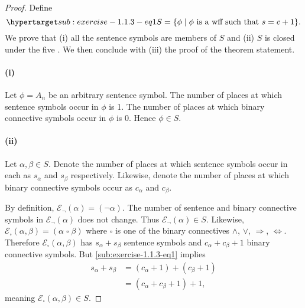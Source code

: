 \documentclass{report}
\begin{document}
  \begin{proof}

    Define
      \begin{equation}
        \hyperlabel{sub:exercise-1.1.3-eq1}
        S = \{\phi \mid \phi \text{ is a wff such that } s = c + 1\}.
      \end{equation}
    We prove that (i) all the sentence symbols are members of $S$ and (ii)
      $S$ is closed under the five .
    We then conclude with (iii) the proof of the theorem statement.

    \paragraph{(i)}%

      Let $\phi = A_n$ be an arbitrary sentence symbol.
      The number of places at which sentence symbols occur in $\phi$ is 1.
      The number of places at which binary connective symbols occur in $\phi$ is
        0.
      Hence $\phi \in S$.

    \paragraph{(ii)}%

      Let $\alpha, \beta \in S$.
      Denote the number of places at which sentence symbols occur in each as
        $s_\alpha$ and $s_\beta$ respectively.
      Likewise, denote the number of places at which binary connective symbols
        occur as $c_\alpha$ and $c_\beta$.

      By definition, $\mathcal{E}_{\neg}(\alpha) = (\neg\alpha)$.
      The number of sentence and binary connective symbols in
        $\mathcal{E}_{\neg}(\alpha)$ does not change.
      Thus $\mathcal{E}_{\neg}(\alpha) \in S$.
      Likewise,
        $\mathcal{E}_{\square}(\alpha, \beta) = (\alpha \mathop{\square} \beta)$
        where $\square$ is one of the binary connectives $\land$, $\lor$,
          $\Rightarrow$, $\Leftrightarrow$.
      Therefore $\mathcal{E}_{\square}(\alpha, \beta)$ has $s_\alpha + s_\beta$
        sentence symbols and $c_\alpha + c_\beta + 1$ binary connective symbols.
      But \eqref{sub:exercise-1.1.3-eq1} implies
        \begin{align*}
          s_\alpha + s_\beta
            & = (c_\alpha + 1) + (c_\beta + 1) \\
            & = (c_\alpha + c_\beta + 1) + 1,
        \end{align*}
      meaning $\mathcal{E}_{\square}(\alpha, \beta) \in S$.


\end{proof}
\end{document}
